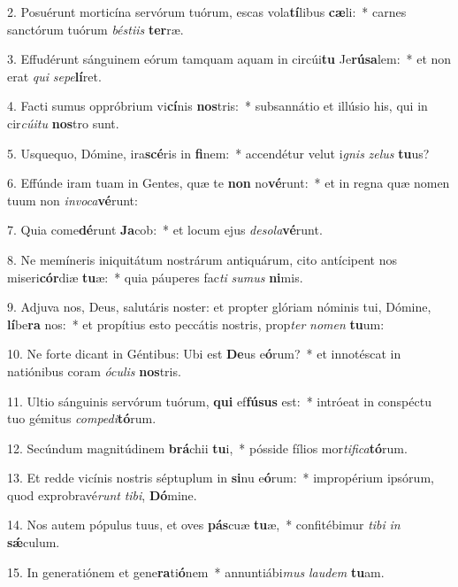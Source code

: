 2. Posuérunt morticína servórum tuórum, escas vola\textbf{tí}libus \textbf{cæ}li:~*  carnes sanctórum tuórum \textit{bés}\textit{ti}\textit{is} \textbf{ter}ræ.\

3. Effudérunt sánguinem eórum tamquam aquam in circúi\textbf{tu} Je\textbf{rú}\textbf{sa}lem:~*  et non erat \textit{qui} \textit{se}\textit{pe}\textbf{lí}ret.\

4. Facti sumus oppróbrium vi\textbf{cí}nis \textbf{nos}tris:~*  subsannátio et illúsio his, qui in cir\textit{cú}\textit{i}\textit{tu} \textbf{nos}tro sunt.\

5. Usquequo, Dómine, ira\textbf{scé}ris in \textbf{fi}nem:~*  accendétur velut i\textit{gnis} \textit{ze}\textit{lus} \textbf{tu}us?\

6. Effúnde iram tuam in Gentes, quæ te \textbf{non} no\textbf{vé}runt:~*  et in regna quæ nomen tuum non \textit{in}\textit{vo}\textit{ca}\textbf{vé}runt:\

7. Quia come\textbf{dé}runt \textbf{Ja}cob:~*  et locum ejus \textit{de}\textit{so}\textit{la}\textbf{vé}runt.\

8. Ne memíneris iniquitátum nostrárum antiquárum, cito antícipent nos miseri\textbf{cór}diæ \textbf{tu}æ:~*  quia páuperes fac\textit{ti} \textit{su}\textit{mus} \textbf{ni}mis.\

9. Adjuva nos, Deus, salutáris noster: et propter glóriam nóminis tui, Dómine, \textbf{lí}be\textbf{ra} nos:~*  et propítius esto peccátis nostris, prop\textit{ter} \textit{no}\textit{men} \textbf{tu}um:\

10. Ne forte dicant in Géntibus: Ubi est \textbf{De}us e\textbf{ó}rum?~*  et innotéscat in natiónibus coram \textit{ó}\textit{cu}\textit{lis} \textbf{nos}tris.\

11. Ultio sánguinis servórum tuórum, \textbf{qui} ef\textbf{fú}\textbf{sus} est:~*  intróeat in conspéctu tuo gémitus \textit{com}\textit{pe}\textit{di}\textbf{tó}rum.\

12. Secúndum magnitúdinem \textbf{brá}chii \textbf{tu}i,~*  pósside fílios mor\textit{ti}\textit{fi}\textit{ca}\textbf{tó}rum.\

13. Et redde vicínis nostris séptuplum in \textbf{si}nu e\textbf{ó}rum:~*  impropérium ipsórum, quod exprobravé\textit{runt} \textit{ti}\textit{bi}, \textbf{Dó}mine.\

14. Nos autem pópulus tuus, et oves \textbf{pás}cuæ \textbf{tu}æ,~*  confitébimur \textit{ti}\textit{bi} \textit{in} \textbf{sǽ}culum.\

15. In generatiónem et gene\textbf{ra}ti\textbf{ó}nem~*  annuntiábi\textit{mus} \textit{lau}\textit{dem} \textbf{tu}am.\

